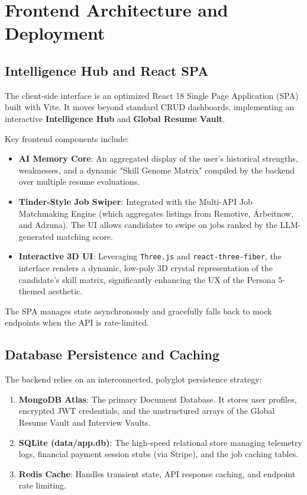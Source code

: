 \section{Frontend Architecture and Deployment}\label{sec:frontend}

\subsection{Intelligence Hub and React SPA}
The client-side interface is an optimized React 18 Single Page Application (SPA) built with Vite. It moves beyond standard CRUD dashboards, implementing an interactive \textbf{Intelligence Hub} and \textbf{Global Resume Vault}.

Key frontend components include:
\begin{itemize}
    \item \textbf{AI Memory Core}: An aggregated display of the user's historical strengths, weaknesses, and a dynamic "Skill Genome Matrix" compiled by the backend over multiple resume evaluations.
    \item \textbf{Tinder-Style Job Swiper}: Integrated with the Multi-API Job Matchmaking Engine (which aggregates listings from Remotive, Arbeitnow, and Adzuna). The UI allows candidates to swipe on jobs ranked by the LLM-generated matching score.
    \item \textbf{Interactive 3D UI}: Leveraging \texttt{Three.js} and \texttt{react-three-fiber}, the interface renders a dynamic, low-poly 3D crystal representation of the candidate's skill matrix, significantly enhancing the UX of the Persona 5-themed aesthetic.
\end{itemize}
The SPA manages state asynchronously and gracefully falls back to mock endpoints when the API is rate-limited.

\subsection{Database Persistence and Caching}
The backend relies on an interconnected, polyglot persistence strategy:
\begin{enumerate}
    \item \textbf{MongoDB Atlas}: The primary Document Database. It stores user profiles, encrypted JWT credentials, and the unstructured arrays of the Global Resume Vault and Interview Vaults.
    \item \textbf{SQLite (data/app.db)}: The high-speed relational store managing telemetry logs, financial payment session stubs (via Stripe), and the job caching tables.
    \item \textbf{Redis Cache}: Handles transient state, API response caching, and endpoint rate limiting.
\end{enumerate}

